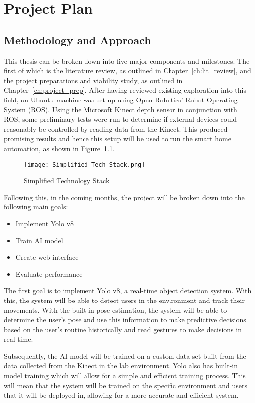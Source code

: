 \chapter{Project Plan}\label{ch:plan}

\section{Methodology and Approach}
This thesis can be broken down into five major components and milestones.
The first of which is the literature review, as outlined in Chapter~\ref{ch:lit_review}, and the project preparations and viability study, as outlined in Chapter~\ref{ch:project_prep}.
After having reviewed existing exploration into this field, an Ubuntu machine was set up using Open Robotics' Robot Operating System (ROS).
Using the Microsoft Kinect depth sensor in conjunction with ROS, some preliminary tests were run to determine if external devices could reasonably be controlled by reading data from the Kinect.
This produced promising results and hence this setup will be used to run the smart home automation, as shown in Figure~\ref{fig:simple_tech_stack}.

\begin{figure}[!htb]
    \caption{Simplified Technology Stack}
    \centering
    \texttt{[image: Simplified Tech Stack.png]}
    \label{fig:simple_tech_stack}
\end{figure}

Following this, in the coming months, the project will be broken down into the following main goals:

\begin{itemize}
    \item Implement Yolo v8
    \item Train AI model
    \item Create web interface
    \item Evaluate performance
\end{itemize}

The first goal is to implement Yolo v8, a real-time object detection system.
With this, the system will be able to detect users in the environment and track their movements.
With the built-in pose estimation, the system will be able to determine the user's pose and use this information to make predictive decisions based on the user's routine historically and read gestures to make decisions in real time.

Subsequently, the AI model will be trained on a custom data set built from the data collected from the Kinect in the lab environment.
Yolo also has built-in model training which will allow for a simple and efficient training process.
This will mean that the system will be trained on the specific environment and users that it will be deployed in, allowing for a more accurate and efficient system.

